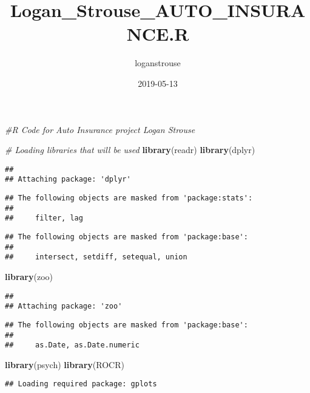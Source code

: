 \documentclass[]{article}
\title{Logan\_Strouse\_AUTO\_INSURANCE.R}
\author{loganstrouse}
\date{2019-05-13}
\newenvironment{Shaded}{\begin{snugshade}}{\end{snugshade}}
\newcommand{\CommentTok}[1]{\textcolor[rgb]{0.56,0.35,0.01}{\textit{#1}}}
\newcommand{\KeywordTok}[1]{\textcolor[rgb]{0.13,0.29,0.53}{\textbf{#1}}}
\newcommand{\NormalTok}[1]{#1}
\begin{document}
\maketitle

\begin{Shaded}
\begin{Highlighting}[]
\CommentTok{#R Code for Auto Insurance project Logan Strouse}

\CommentTok{# Loading libraries that will be used}
\KeywordTok{library}\NormalTok{(readr)}
\KeywordTok{library}\NormalTok{(dplyr)}
\end{Highlighting}
\end{Shaded}

\begin{verbatim}
## 
## Attaching package: 'dplyr'
\end{verbatim}

\begin{verbatim}
## The following objects are masked from 'package:stats':
## 
##     filter, lag
\end{verbatim}

\begin{verbatim}
## The following objects are masked from 'package:base':
## 
##     intersect, setdiff, setequal, union
\end{verbatim}

\begin{Shaded}
\begin{Highlighting}[]
\KeywordTok{library}\NormalTok{(zoo)}
\end{Highlighting}
\end{Shaded}

\begin{verbatim}
## 
## Attaching package: 'zoo'
\end{verbatim}

\begin{verbatim}
## The following objects are masked from 'package:base':
## 
##     as.Date, as.Date.numeric
\end{verbatim}

\begin{Shaded}
\begin{Highlighting}[]
\KeywordTok{library}\NormalTok{(psych)}
\KeywordTok{library}\NormalTok{(ROCR)}
\end{Highlighting}
\end{Shaded}

\begin{verbatim}
## Loading required package: gplots
\end{verbatim}
\end{document}
